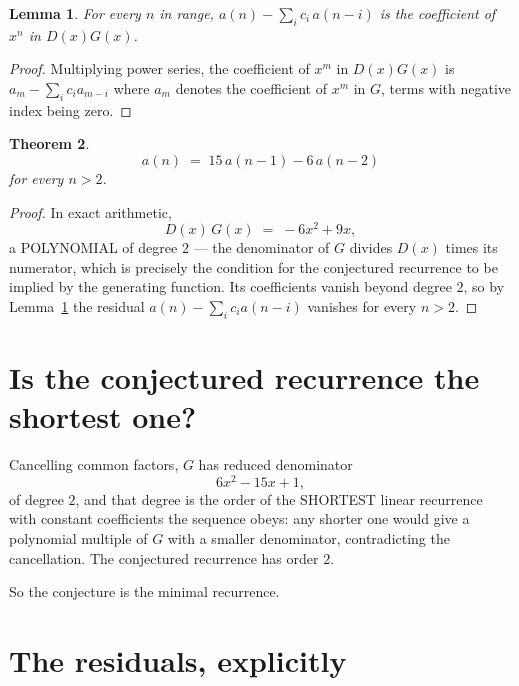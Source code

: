 \documentclass[11pt,a4paper]{article}
\theoremstyle{plain}
\newtheorem{theorem}{Theorem}
\newtheorem{lemma}[theorem]{Lemma}
\theoremstyle{definition}
\begin{document}
\begin{lemma}\label{lem:key}
For every $n$ in range, $a(n)-\sum_i c_i\,a(n-i)$ is the coefficient of $x^{n}$ in
$D(x)G(x)$.
\end{lemma}

\begin{proof}
Multiplying power series, the coefficient of $x^{m}$ in $D(x)G(x)$ is
$a_m-\sum_i c_i a_{m-i}$ where $a_m$ denotes the coefficient of $x^{m}$ in $G$, terms with
negative index being zero.
\end{proof}

\begin{theorem}
\[
a(n)\;=\;15\,a(n-1) - 6\,a(n-2)
\]
for every $n>2$.
\end{theorem}

\begin{proof}
In exact arithmetic,
\[
D(x)\,G(x)\;=\;- 6 x^{2} + 9 x,
\]
a POLYNOMIAL of degree $2$ --- the denominator of $G$ divides $D(x)$ times its numerator,
which is precisely the condition for the conjectured recurrence to be implied by the
generating function. Its coefficients vanish beyond degree $2$, so by
Lemma~\ref{lem:key} the residual $a(n)-\sum_ic_ia(n-i)$ vanishes for every
$n>2$.
\end{proof}

\section{Is the conjectured recurrence the shortest one?}

Cancelling common factors, $G$ has reduced denominator
\[
6 x^{2} - 15 x + 1,
\]
of degree $2$, and that degree is the order of the SHORTEST linear recurrence with
constant coefficients the sequence obeys: any shorter one would give a polynomial multiple of
$G$ with a smaller denominator, contradicting the cancellation. The conjectured recurrence has
order $2$.

So the conjecture is the minimal recurrence.

\section{The residuals, explicitly}
\end{document}
